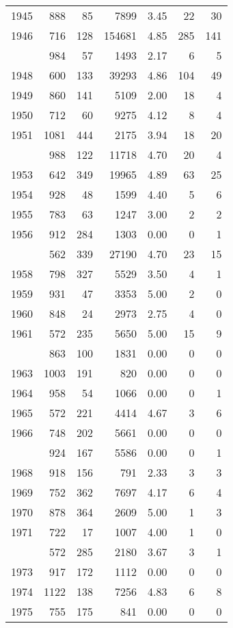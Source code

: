 \documentclass[
]{article}
\begin{document}
\begin{table}
\begin{tabular}[t]{lrrrrrr}
1945 & 888 & 85 & 7899 & 3.45 & 22 & 30\\
1946 & 716 & 128 & 154681 & 4.85 & 285 & 141\\
\addlinespace
1947 & 984 & 57 & 1493 & 2.17 & 6 & 5\\
1948 & 600 & 133 & 39293 & 4.86 & 104 & 49\\
1949 & 860 & 141 & 5109 & 2.00 & 18 & 4\\
1950 & 712 & 60 & 9275 & 4.12 & 8 & 4\\
1951 & 1081 & 444 & 2175 & 3.94 & 18 & 20\\
\addlinespace
1952 & 988 & 122 & 11718 & 4.70 & 20 & 4\\
1953 & 642 & 349 & 19965 & 4.89 & 63 & 25\\
1954 & 928 & 48 & 1599 & 4.40 & 5 & 6\\
1955 & 783 & 63 & 1247 & 3.00 & 2 & 2\\
1956 & 912 & 284 & 1303 & 0.00 & 0 & 1\\
\addlinespace
1957 & 562 & 339 & 27190 & 4.70 & 23 & 15\\
1958 & 798 & 327 & 5529 & 3.50 & 4 & 1\\
1959 & 931 & 47 & 3353 & 5.00 & 2 & 0\\
1960 & 848 & 24 & 2973 & 2.75 & 4 & 0\\
1961 & 572 & 235 & 5650 & 5.00 & 15 & 9\\
\addlinespace
1962 & 863 & 100 & 1831 & 0.00 & 0 & 0\\
1963 & 1003 & 191 & 820 & 0.00 & 0 & 0\\
1964 & 958 & 54 & 1066 & 0.00 & 0 & 1\\
1965 & 572 & 221 & 4414 & 4.67 & 3 & 6\\
1966 & 748 & 202 & 5661 & 0.00 & 0 & 0\\
\addlinespace
1967 & 924 & 167 & 5586 & 0.00 & 0 & 1\\
1968 & 918 & 156 & 791 & 2.33 & 3 & 3\\
1969 & 752 & 362 & 7697 & 4.17 & 6 & 4\\
1970 & 878 & 364 & 2609 & 5.00 & 1 & 3\\
1971 & 722 & 17 & 1007 & 4.00 & 1 & 0\\
\addlinespace
1972 & 572 & 285 & 2180 & 3.67 & 3 & 1\\
1973 & 917 & 172 & 1112 & 0.00 & 0 & 0\\
1974 & 1122 & 138 & 7256 & 4.83 & 6 & 8\\
1975 & 755 & 175 & 841 & 0.00 & 0 & 0\\

\end{tabular}
\end{table}
\end{document}
